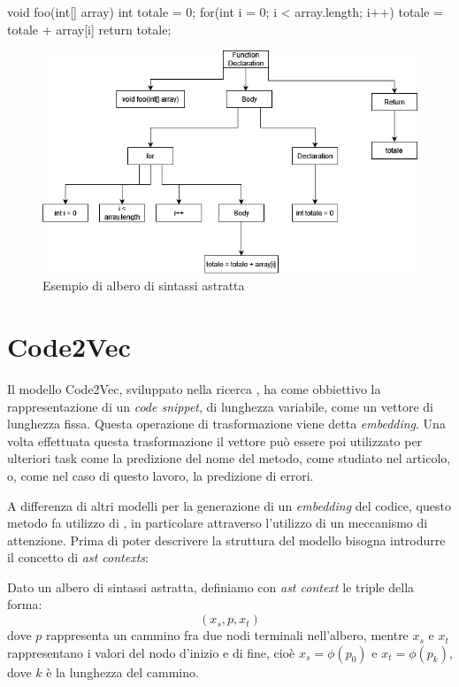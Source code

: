  \begin{code}[caption={Frammento di codice che calcola la somma dei valori in un vettore}, label={code:esempio}]
    void foo(int[] array){
      int totale = 0;
      for(int i = 0; i < array.length; i++){
        totale = totale + array[i]
      }
      return totale;
    }
  \end{code}
  \begin{figure}[h]
    \centering
    \includegraphics[scale=0.5]{images/astEsempio.png}
    \caption{Esempio di albero di sintassi astratta}
    \label{fig:ast_esempio}
  \end{figure}


\section{Code2Vec}\label{sec:code2vec}
Il modello Code2Vec, sviluppato nella ricerca \cite{alon2019code2vec}, ha come obbiettivo la rappresentazione di un \textit{code snippet}, di lunghezza variabile, come un vettore di lunghezza fissa.
Questa operazione di trasformazione viene detta \textit{embedding}.
Una volta effettuata questa trasformazione il vettore può essere poi utilizzato per ulteriori task come la predizione del nome del metodo, come studiato nel articolo, o, come nel caso di questo lavoro, la predizione di errori.

A differenza di altri modelli per la generazione di un \textit{embedding} del codice, questo metodo fa utilizzo di \DL, in particolare attraverso l'utilizzo di un meccanismo di attenzione.
Prima di poter descrivere la struttura del modello bisogna introdurre il concetto di \textit{ast contexts}:

\begin{definition}
    \label{def:ast_context}
    Dato un albero di sintassi astratta, definiamo con \textit{ast context} le triple della forma:
  \[(x_s, p, x_t)\]
dove $p$ rappresenta un cammino fra due nodi terminali nell'albero, mentre $x_s$ e $x_t$ rappresentano i valori del nodo d'inizio e di fine, cioè $x_s = \phi(p_0)$ e $x_t = \phi(p_{k})$, dove $k$ è la lunghezza del cammino.
\end{definition}

